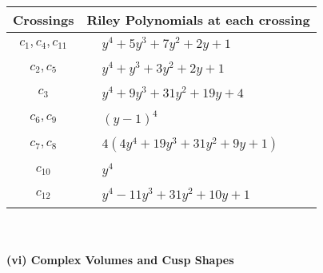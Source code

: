 \documentclass[1p]{elsarticle_modified}
\theoremstyle{definition}
\begin{document}
\begin{tabular}{m{50pt}|m{274pt}}
Crossings & \hspace{64pt}Riley Polynomials at each crossing \\
\hline $$\begin{aligned}c_{1},c_{4},c_{11}\end{aligned}$$&$\begin{aligned}
&y^4+5 y^3+7 y^2+2 y+1
\end{aligned}$\\
\hline $$\begin{aligned}c_{2},c_{5}\end{aligned}$$&$\begin{aligned}
&y^4+y^3+3 y^2+2 y+1
\end{aligned}$\\
\hline $$\begin{aligned}c_{3}\end{aligned}$$&$\begin{aligned}
&y^4+9 y^3+31 y^2+19 y+4
\end{aligned}$\\
\hline $$\begin{aligned}c_{6},c_{9}\end{aligned}$$&$\begin{aligned}
&(y-1)^4
\end{aligned}$\\
\hline $$\begin{aligned}c_{7},c_{8}\end{aligned}$$&$\begin{aligned}
&4(4 y^4+19 y^3+31 y^2+9 y+1)
\end{aligned}$\\
\hline $$\begin{aligned}c_{10}\end{aligned}$$&$\begin{aligned}
&y^4
\end{aligned}$\\
\hline $$\begin{aligned}c_{12}\end{aligned}$$&$\begin{aligned}
&y^4-11 y^3+31 y^2+10 y+1
\end{aligned}$\\
\hline
\end{tabular}\\~\\
\newpage\flushleft \textbf{(vi) Complex Volumes and Cusp Shapes}
\end{document}
